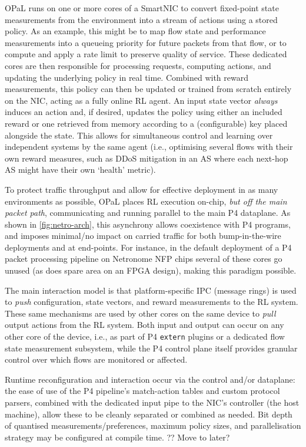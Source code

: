 \documentclass[sigconf,natbib=false]{acmart}
\newcommand{\approachshort}{OPaL}
\begin{document}
\approachshort{} runs on one or more cores of a SmartNIC to convert fixed-point state measurements from the environment into a stream of actions using a stored policy.
As an example, this might be to map flow state and performance measurements into a queueing priority for future packets from that flow, or to compute and apply a rate limit to preserve quality of service.
These dedicated cores are then responsible for processing requests, computing actions, and updating the underlying policy in real time.
Combined with reward measurements, this policy can then be updated or trained from scratch entirely on the NIC, acting as a fully online RL agent.
An input state vector \emph{always} induces an action and, if desired, updates the policy using either an included reward or one retrieved from memory according to a (configurable) key placed alongside the state.
This allows for simultaneous control and learning over independent systems by the same agent (i.e., optimising several flows with their own reward measures, such as DDoS mitigation in an AS where each next-hop AS might have their own `health' metric).


To protect traffic throughput and allow for effective deployment in as many environments as possible, \approachshort{} places RL execution on-chip, \emph{but off the main packet path}, communicating and running parallel to the main P4 dataplane.
As shown in \cref{fig:netro-arch}, this asynchrony allows coexistence with P4 programs, and imposes minimal/no impact on carried traffic for both bump-in-the-wire deployments and at end-points.
For instance, in the default deployment of a P4 packet processing pipeline on Netronome NFP chips several of these cores go unused (as does spare area on an FPGA design), making this paradigm possible.

The main interaction model is that platform-specific IPC (message rings) is used to \emph{push} configuration, state vectors, and reward measurements to the RL system.
These same mechanisms are used by other cores on the same device to \emph{pull} output actions from the RL system.
Both input and output can occur on any other core of the device, i.e., as part of P4 \texttt{extern} plugins or a dedicated flow state measurement subsystem, while the P4 control plane itself provides granular control over which flows are monitored or affected.

Runtime reconfiguration and interaction occur via the control and/or dataplane: the ease of use of the P4 pipeline's match-action tables and custom protocol parsers, combined with the dedicated input pipe to the NIC's controller (the host machine), allow these to be cleanly separated or combined as needed.
Bit depth of quantised measurements/preferences, maximum policy sizes, and parallelisation strategy may be configured at compile time.
?? Move to later?
\end{document}

